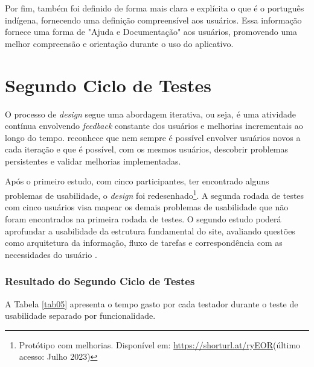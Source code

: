 Por fim, também foi definido de forma mais clara e explícita o que é o português indígena, fornecendo uma definição compreensível aos usuários. Essa informação fornece uma forma de "Ajuda e Documentação" aos usuários, promovendo uma melhor 
compreensão e orientação durante o uso do aplicativo.


\section{Segundo Ciclo de Testes}
\label{sec:Segundo Ciclo}
O processo de \textit{design} segue uma abordagem iterativa, ou seja, é uma atividade contínua envolvendo \textit{feedback} constante dos usuários e melhorias incrementais ao longo do tempo.  
reconhece que nem sempre é possível envolver usuários novos a cada iteração e que é possível, com os mesmos usuários, descobrir problemas persistentes e validar melhorias implementadas. 

Após o primeiro estudo, com cinco participantes, ter encontrado alguns problemas de usabilidade, o \textit{design} foi redesenhado\footnote{Protótipo com melhorias. Disponível em: \url{https://shorturl.at/ryEOR}(último acesso: Julho 2023)}. 
A segunda rodada de testes com cinco usuários visa mapear os demais problemas de usabilidade que não foram encontrados na primeira rodada de testes. O segundo estudo poderá aprofundar a usabilidade da estrutura fundamental do site, avaliando questões como arquitetura da informação, fluxo de tarefas e correspondência 
com as necessidades do usuário \cite{usabilitytest}.

\subsubsection{Resultado do Segundo Ciclo de Testes}
\label{sec:Resultado do Segundo Ciclo de Testes}
A Tabela \ref{tab05} apresenta o tempo gasto por cada testador durante o teste de usabilidade separado por funcionalidade.

